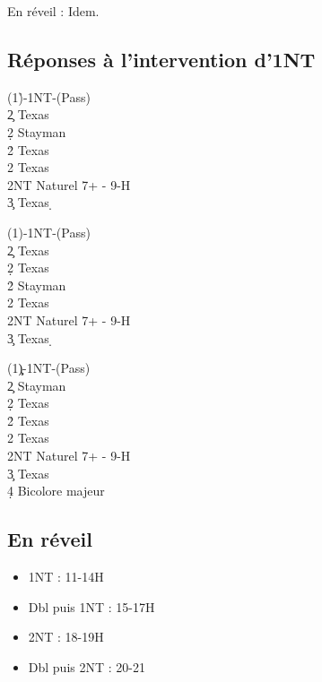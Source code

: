 \documentclass[a4paper]{article}
\begin{document}
En réveil : Idem.

\subsection{Réponses à l'intervention d'1NT}

\begin{bidtable}
(1\h)-1NT-(Pass)\+\\
2\c \> Texas \d \\
2\d \> Stayman\\
2\h \> Texas \s \\
2\s \> Texas \c \\
2NT \> Naturel 7+ - 9-H\\
3\c \> Texas \d \-
\end{bidtable}

\begin{bidtable}
(1\s)-1NT-(Pass)\+\\
2\c \> Texas \d \\
2\d \> Texas \h \\
2\h \> Stayman\\
2\s \> Texas \c \\
2NT \> Naturel 7+ - 9-H\\
3\c \> Texas \d \-
\end{bidtable}

\begin{bidtable}
(1\c\d)-1NT-(Pass)\+\\
2\c \> Stayman\\
2\d \> Texas \h \\
2\h \> Texas \s \\
2\s \> Texas \c \\
2NT \> Naturel 7+ - 9-H\\
3\c \> Texas \d \\
4\d \> Bicolore majeur\-
\end{bidtable}

\subsection{En réveil}

\begin{itemize}
\item 1NT : 11-14H

\item Dbl puis 1NT : 15-17H

\item 2NT : 18-19H

\item Dbl puis 2NT : 20-21

\end{itemize}
\end{document}
